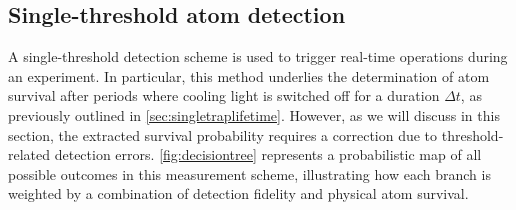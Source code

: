 \documentclass[../Thesis-IJspeert.tex]{subfiles}
\begin{document}
\subsection{Single-threshold atom detection}
A single-threshold detection scheme is used to trigger real-time operations during an experiment. In particular, this method underlies the determination of atom survival after periods where cooling light is switched off for a duration $\Delta t$, as previously outlined in \autoref{sec:singletraplifetime}. However, as we will discuss in this section, the extracted survival probability requires a correction due to threshold-related detection errors. \autoref{fig:decisiontree} represents a probabilistic map of all possible outcomes in this measurement scheme, illustrating how each branch is weighted by a combination of detection fidelity and physical atom survival.
\end{document}
